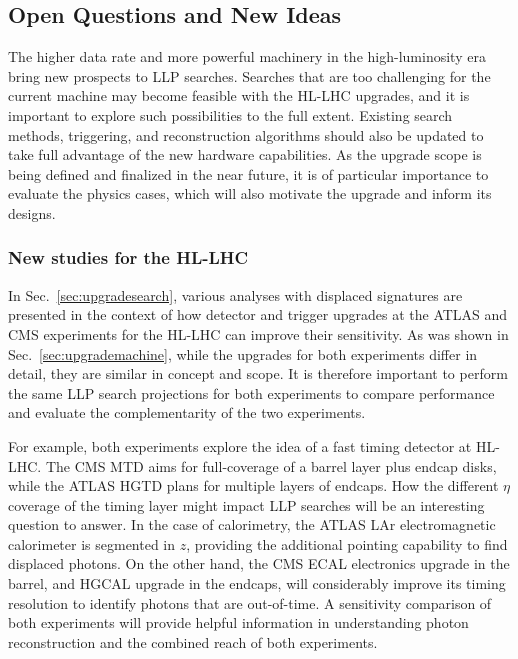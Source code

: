 \subsection{Open Questions and New Ideas}\label{sec:upgradeideas}


The higher data rate and more powerful machinery in the high-luminosity era bring new prospects to LLP searches. Searches that are too challenging for the current machine may become feasible with the HL-LHC upgrades, and it is important to explore such possibilities to the full extent. Existing search methods, triggering, and reconstruction algorithms should also be updated to take full advantage of the new hardware capabilities. As the upgrade scope is being defined and finalized in the near future, it is of particular importance to evaluate the physics cases, which will also motivate the upgrade and inform its designs. 

\subsubsection{New studies for the HL-LHC}

In Sec.~\ref{sec:upgradesearch}, various analyses with displaced signatures are presented in the context of how detector and trigger upgrades at the ATLAS and CMS experiments for the HL-LHC can improve their sensitivity. As was shown in Sec.~\ref{sec:upgrademachine}, while the upgrades for both experiments differ in detail, they are similar in concept and scope. It is therefore important to perform the same LLP search projections for both experiments to compare performance and evaluate the complementarity of the two experiments. 

For example, both experiments explore the idea of a fast timing detector at HL-LHC. The CMS MTD aims for full-coverage of a barrel layer plus endcap disks, while the ATLAS HGTD plans for multiple layers of endcaps. How the different $\eta$ coverage of the timing layer might impact LLP searches will be an interesting question to answer. In the case of calorimetry, the ATLAS LAr electromagnetic calorimeter is segmented in $z$, providing the additional pointing capability to find displaced photons. On the other hand, the CMS ECAL electronics upgrade in the barrel, and HGCAL upgrade in the endcaps, will considerably improve its timing resolution to identify photons that are out-of-time. A sensitivity comparison of both experiments will provide helpful information in understanding photon reconstruction and the combined reach of both experiments. 

